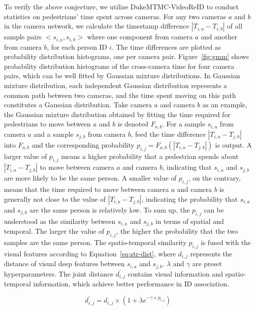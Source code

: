 \documentclass[10pt,twocolumn,letterpaper]{article}
\begin{document}
To verify the above conjecture, we utilize DukeMTMC-VideoReID to conduct statistics on pedestrians' time spent across cameras. For any two cameras $a$ and $b$ in the camera network, we calculate the timestamp difference $|T_{i,a} - T_{i,b}|$ of all sample pairs $<s_{i,a}, s_{i, b}>$ where one component from camera $a$ and another from camera $b$, for each person ID $i$. The time differences are plotted as probability distribution histograms, one per camera pair. Figure~\ref{fig:gmm} shows probability distribution histograms of the cross-camera time for four camera pairs, which can be well fitted by Gaussian mixture distributions. In Gaussian mixture distribution, each independent Gaussian distribution represents a common path between two cameras, and the time spent moving on this path constitutes a Gaussian distribution. Take camera $a$ and camera $b$ as an example, the Gaussian mixture distribution obtained by fitting the time required for pedestrians to move between $a$ and $b$ is denoted $F_{a,b}$. For a sample $s_{i,a}$ from camera $a$ and a sample $s_{j,b}$ from camera $b$, feed the time difference $|T_{i,a} - T_{j,b}|$ into $F_{a,b}$ and the corresponding probability $p_{i,j} = F_{a,b}(|T_{i,a} - T_{j,b}|)$ is output. A larger value of $p_{i,j}$ means a higher probability that a pedestrian spends about $|T_{i,a} - T_{j,b}|$ to move between camera $a$ and camera $b$, indicating that $s_{i,a}$ and $s_{j,b}$ are more likely to be the same person. A smaller value of $p_{i,j}$, on the contrary, means that the time required to move between camera $a$ and camera $b$ is generally not close to the value of $|T_{i,a} - T_{j,b}|$, indicating the probability that $s_{i,a}$ and $s_{j,b}$ are the same person is relatively low. To sum up, the $p_{i,j}$ can be understood as the similarity between $s_{i,a}$ and $s_{j,b}$ in terms of spatial and temporal. The larger the value of $p_{i,j}$, the higher the probability that the two samples are the same person. The spatio-temporal similarity $p_{i,j}$ is fused with the visual features according to Equation~\ref{eq:str-dist}, where $d_{i,j}$ represents the distance of visual deep features between $s_{i,a}$ and $s_{j,b}$. $\lambda$ and $\gamma$ are preset hyperparameters. The joint distance $d^{'}_{i,j}$ contains visual information and spatio-temporal information, which achieve better performance in ID association.

\begin{equation}
    d_{i, j}^{\prime}=d_{i, j} \times\left(1+\lambda e^{-\gamma \times p_{i, j}}\right)
    \label{eq:str-dist}
\end{equation}
\end{document}
